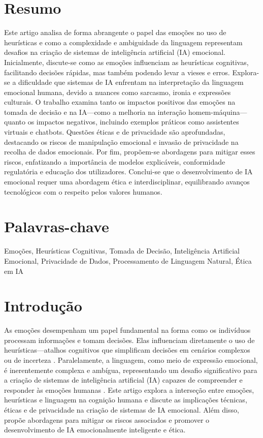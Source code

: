 \documentclass[a4paper,12pt]{report}
\begin{document}
	\section*{Resumo}
	Este artigo analisa de forma abrangente o papel das emoções no uso de heurísticas e como a complexidade e ambiguidade da linguagem representam desafios na criação de sistemas de inteligência artificial (IA) emocional. Inicialmente, discute-se como as emoções influenciam as heurísticas cognitivas, facilitando decisões rápidas, mas também podendo levar a vieses e erros. Explora-se a dificuldade que sistemas de IA enfrentam na interpretação da linguagem emocional humana, devido a nuances como sarcasmo, ironia e expressões culturais. O trabalho examina tanto os impactos positivos das emoções na tomada de decisão e na IA—como a melhoria na interação homem-máquina—quanto os impactos negativos, incluindo exemplos práticos como assistentes virtuais e chatbots. Questões éticas e de privacidade são aprofundadas, destacando os riscos de manipulação emocional e invasão de privacidade na recolha de dados emocionais. Por fim, propõem-se abordagens para mitigar esses riscos, enfatizando a importância de modelos explicáveis, conformidade regulatória e educação dos utilizadores. Conclui-se que o desenvolvimento de IA emocional requer uma abordagem ética e interdisciplinar, equilibrando avanços tecnológicos com o respeito pelos valores humanos.
	
	\section*{Palavras-chave}
	Emoções, Heurísticas Cognitivas, Tomada de Decisão, Inteligência Artificial Emocional, Privacidade de Dados, Processamento de Linguagem Natural, Ética em IA
	
	\newpage
	
	
	\section{Introdução}
	
	As emoções desempenham um papel fundamental na forma como os indivíduos processam informações e tomam decisões. Elas influenciam diretamente o uso de heurísticas—atalhos cognitivos que simplificam decisões em cenários complexos ou de incerteza \parencite{kahneman1974}. Paralelamente, a linguagem, como meio de expressão emocional, é inerentemente complexa e ambígua, representando um desafio significativo para a criação de sistemas de inteligência artificial (IA) capazes de compreender e responder às emoções humanas \parencite{chomsky1965}. Este artigo explora a interseção entre emoções, heurísticas e linguagem na cognição humana e discute as implicações técnicas, éticas e de privacidade na criação de sistemas de IA emocional. Além disso, propõe abordagens para mitigar os riscos associados e promover o desenvolvimento de IA emocionalmente inteligente e ética.
	
\end{document}
